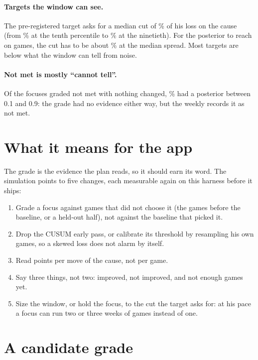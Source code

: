 \documentclass[11pt]{article}
\begin{document}
\paragraph{Targets the window can see.} The pre-registered target asks for a median cut of
\TargetCut\% of his loss on the cause (from \TargetCutLo\% at the tenth percentile to
\TargetCutHi\% at the ninetieth). For the posterior to reach \SuccessP{} on \Window{} games, the cut has to be
about \NeededCut\% at the median spread. Most targets are below what the window can tell from
noise.

\paragraph{Not met is mostly ``cannot tell''.} Of the focuses graded not met with nothing
changed, \NotMetUnclear\% had a posterior between 0.1 and 0.9: the grade had no evidence either
way, but the weekly records it as not met.

\section{What it means for the app}

The grade is the evidence the plan reads, so it should earn its word. The simulation points to
five changes, each measurable again on this harness before it ships:

\begin{enumerate}[nosep]
\item Grade a focus against games that did not choose it (the games before the baseline, or a
held-out half), not against the baseline that picked it.
\item Drop the CUSUM early pass, or calibrate its threshold by resampling his own games, so a
skewed loss does not alarm by itself.
\item Read points per move of the cause, not per game.
\item Say three things, not two: improved, not improved, and not enough games yet.
\item Size the window, or hold the focus, to the cut the target asks for: at his pace a focus
can run two or three weeks of games instead of one.
\end{enumerate}

\section{A candidate grade}
\end{document}
